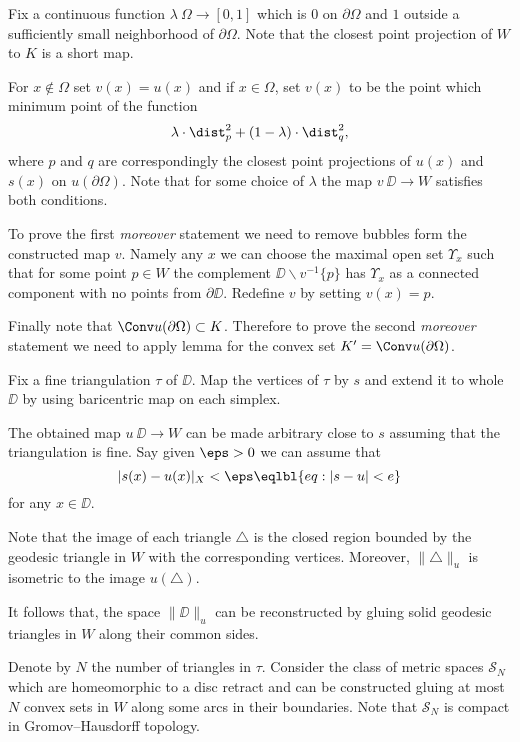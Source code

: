 Fix a continuous function $\lambda\:\Omega\to [0,1]$
which is $0$ on $\partial \Omega$ and $1$ outside a sufficiently small neighborhood of $\partial \Omega$.
Note that the closest point projection of $W$ to $K$ is a short map.

For $x\notin \Omega$ set $v(x)=u(x)$ and if 
$x\in \Omega$, set $v(x)$ to be the point which minimum point of the function 
\[\lambda\cdot\dist^2_p+(1-\lambda)\cdot\dist^2_q,\]
where $p$ and $q$ are correspondingly the closest point projections of  $u(x)$ and $s(x)$ on $u(\partial\Omega)$.
Note that for some choice of $\lambda$ the map $v\:\DD\to W$ satisfies
both conditions.

To prove the first \emph{moreover} statement we need to remove bubbles form the constructed map $v$.
Namely any $x$ we can choose the maximal open set $\Upsilon_x$ such that for some point $p\in W$ the complement $\DD\backslash v^{-1}\{p\}$ has $\Upsilon_x$ as a
connected component with no points from $\partial \DD$.
Redefine $v$ by setting $v(x)=p$.

Finally note that $\Conv u(\partial\Omega)\subset K$. 
Therefore to prove the second \emph{moreover} statement 
we need to apply lemma for the convex set $K'=\Conv u(\partial\Omega)$.
\qeds





Fix a fine triangulation $\tau$ of $\DD$.
Map the vertices of $\tau$ by $s$
and extend it to whole $\DD$ by using baricentric map on each simplex.

The obtained map $u\:\DD\to W$ can be made arbitrary close to $s$ assuming that the triangulation is fine.
Say given $\eps>0$ we can assume that 
\[|s(x)-u(x)|_X<\eps\eqlbl{eq:|s-u|<e}\]
for any $x\in\DD$.

Note that the image of each triangle $\triangle$
is the closed region bounded by the geodesic triangle in $W$ with the corresponding vertices.
Moreover,  $\|\triangle\|_u$ is isometric to the image $u(\triangle)$.

It follows that, the space $\|\DD\|_u$ can be reconstructed by gluing solid geodesic triangles in $W$ along their common sides.

Denote by $N$ the number of triangles in $\tau$.
Consider the class of metric spaces $\mathcal{S}_N$ 
which are homeomorphic to a disc retract
and can be constructed gluing at most $N$ convex sets in $W$ 
along some arcs in their boundaries.
Note that $\mathcal{S}_N$ is compact in Gromov--Hausdorff topology.

